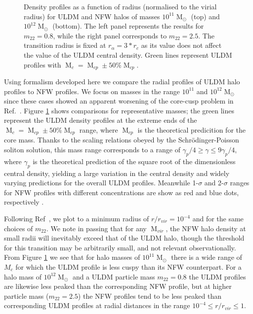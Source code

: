 \documentclass[a4paper,11pt]{article}
\begin{document}
\begin{figure}
\begin{tabular}{cc}
\end{tabular}
\caption{Density profiles as a function of radius (normalised to the virial radius) for ULDM and NFW halos of masses $10^{11}\operatorname{M}_{\odot}$ (top) and $10^{12}\operatorname{M}_{\odot}$ (bottom). The left panel represents the results for $m_{22} = 0.8$, while the right panel corresponds to $m_{22}=2.5$. The transition radius is fixed at $r_{\alpha} = 3*r_c$ as its value does not affect the value of the ULDM central density. Green lines represent  ULDM profiles with $\operatorname{M}_c = \operatorname{M}_{cp} \pm 50 \% \operatorname{M}_{cp}$.}\label{fig:profiles}
\end{figure}

 
Using formalism developed here we compare the radial profiles of ULDM halo profiles to NFW profiles. We focus on masses in the range $10^{11}$ and $10^{12} \operatorname{M}_{\odot}$ since these cases showed an apparent worsening of the core-cusp problem in Ref.~\cite{Robles:2018fur}. Figure \ref{fig:profiles} shows comparisons for representative masses; the green lines represent the ULDM density profiles at the extreme ends of the $\operatorname{M}_c = \operatorname{M}_{cp} \pm 50 \% \operatorname{M}_{cp}$ range, where $\operatorname{M}_{cp}$ is the theoretical predicition for the core mass. Thanks to the scaling relations obeyed by the Schr{\"o}dinger-Poisson soliton solution, this mass range corresponds to a range of $ \gamma_p /4 \geq \gamma \leq 9\gamma_p/4$, where $\gamma_p$ is the theoretical prediction of the square root of the dimensionless central density, yielding a large variation in the central density and widely varying predictions for the overall ULDM profiles. Meanwhile  1-$\sigma$ and 2-$\sigma$ ranges for NFW profiles with different concentrations are show as red and blue dots, respectively \cite{Maccio:2008pcd}. 

Following Ref~\cite{Robles:2018fur}, we plot to a minimum radius of $r/r_{vir} = 10^{-4}$ and for the same choices of $m_{22}$. We note in passing that for any $\operatorname{M}_{vir}$, the NFW halo density at small radii will inevitably exceed that of the ULDM halo, though the threshold for this transition may be arbitrarily small, and not relevant observationally.  From Figure \ref{fig:profiles} we see that for halo masses of $10^{11}\operatorname{M}_{\odot}$ there is a wide range of $M_c$ for which the ULDM profile is less cuspy than its NFW counterpart.  For a halo mass of $10^{12}\operatorname{M}_{\odot}$ and a ULDM particle mass $m_{22}=0.8$ the ULDM profiles are likewise less peaked than the corresponding NFW profile, but at higher particle mass ($m_{22}=2.5$) the  NFW profiles tend to be less peaked than corresponding ULDM profiles at radial distances in  the range $10^{-4}\leq r/r_{vir} \leq 1$.
\end{document}
